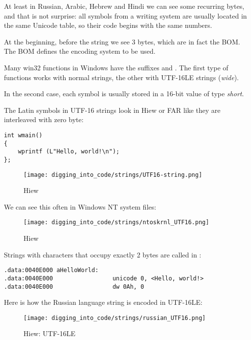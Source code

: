 At least in Russian, Arabic, Hebrew and Hindi we can see some recurring bytes, and that is not surprise:
all symbols from a writing system are usually located in the same Unicode table, so their code begins with
the same numbers.

At the beginning, before the  string we see 3 bytes, which are in fact the \ac{BOM}.
The \ac{BOM} defines the encoding system to be
used.


Many win32 functions in Windows have the suffixes  and .
The first type of functions works
with normal strings, the other with UTF-16LE strings (\emph{wide}).

In the second case, each symbol is usually stored in a 16-bit value of type \emph{short}.

The Latin symbols in UTF-16 strings look in Hiew or FAR like they are interleaved with zero byte:

\begin{lstlisting}[style=customc]
int wmain()
{
	wprintf (L"Hello, world!\n");
};
\end{lstlisting}

\begin{figure}[H]
\centering
\texttt{[image: digging\_into\_code/strings/UTF16-string.png]}
\caption{Hiew}
\end{figure}

We can see this often in \gls{Windows NT} system files:

\begin{figure}[H]
\centering
\texttt{[image: digging\_into\_code/strings/ntoskrnl\_UTF16.png]}
\caption{Hiew}
\end{figure}

Strings with characters that occupy exactly 2 bytes are called  in \IDA:

\begin{lstlisting}[style=customasmx86]
.data:0040E000 aHelloWorld:
.data:0040E000                 unicode 0, <Hello, world!>
.data:0040E000                 dw 0Ah, 0
\end{lstlisting}

Here is how the Russian language string is encoded in UTF-16LE:

\begin{figure}[H]
\centering
\texttt{[image: digging\_into\_code/strings/russian\_UTF16.png]}
\caption{Hiew: UTF-16LE}
\end{figure}

